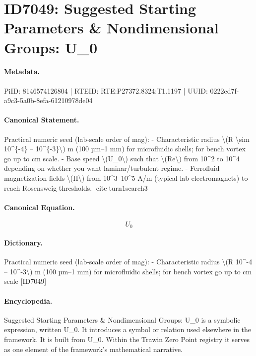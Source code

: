 \section*{ID7049: Suggested Starting Parameters \& Nondimensional Groups: U\_0}
\paragraph{Metadata.}
PiID: 8146574126804 | RTEID: RTE:P27372.8324:T1.1197 | UUID: 0222ed7f-a9c3-5a0b-8efa-61210978de04

\paragraph{Canonical Statement.}
Practical numeric seed (lab-scale order of mag): - Characteristic radius \textbackslash{}(R \textbackslash{}sim 10\textasciicircum{}\{-4\} – 10\textasciicircum{}\{-3\}\textbackslash{}) m (100 µm–1 mm) for microfluidic shells; for bench vortex go up to cm scale. - Base speed \textbackslash{}(U\_0\textbackslash{}) such that \textbackslash{}(Re\textbackslash{}) from 10\textasciicircum{}2 to 10\textasciicircum{}4 depending on whether you want laminar/turbulent regime. - Ferrofluid magnetization fields \textbackslash{}(H\textbackslash{}) from 10\textasciicircum{}3–10\textasciicircum{}5 A/m (typical lab electromagnets) to reach Rosensweig thresholds. citeturn1search3

\paragraph{Canonical Equation.}
\[
U_0
\]

\paragraph{Dictionary.}
Practical numeric seed (lab-scale order of mag): - Characteristic radius \textbackslash{}(R 10\textasciicircum{}-4 – 10\textasciicircum{}-3\textbackslash{}) m (100 µm–1 mm) for microfluidic shells; for bench vortex go up to cm scale [ID7049]

\paragraph{Encyclopedia.}
Suggested Starting Parameters \& Nondimensional Groups: U\_0 is a symbolic expression, written U\_0. It introduces a symbol or relation used elsewhere in the framework. It is built from U\_0. Within the Trawin Zero Point registry it serves as one element of the framework's mathematical narrative.
